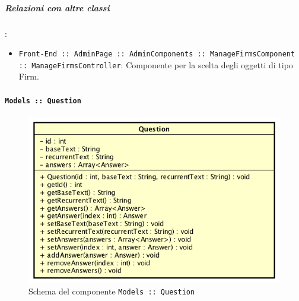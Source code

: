 \documentclass[../DefinizioneDiProdotto_v3.0.0.tex]{subfiles}
\begin{document}
		\subparagraph{Relazioni con altre classi}:
		      \begin{itemize}
		      	\item \texttt{Front-End :: AdminPage :: AdminComponents :: ManageFirmsComponent :: ManageFirmsController}: Componente per la scelta degli oggetti di tipo Firm.
		      \end{itemize}

	\newpage
	\paragraph{\texttt{Models :: Question}}
	\acapo
	\begin{figure}[!h]
		\centering
		\includegraphics[scale=0.7]{Architettura/Front-End/Models/Question.png}
		\caption{Schema del componente \texttt{Models :: Question}}
	\end{figure}
\end{document}
